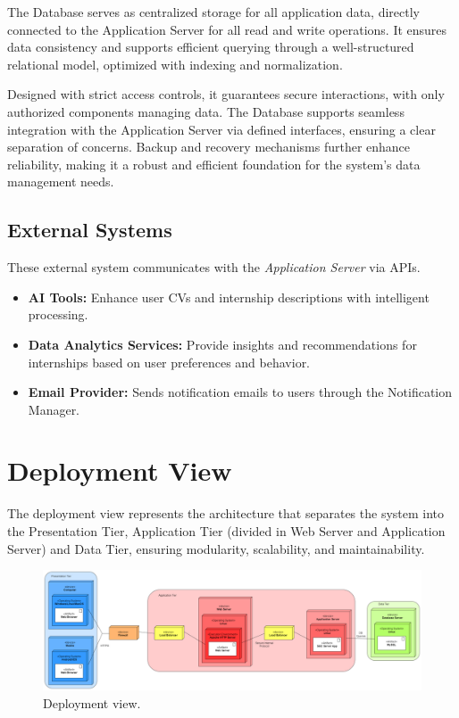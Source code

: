 The Database serves as centralized storage for all application data, directly connected to the Application Server for all read and write operations. It ensures data consistency and supports efficient querying through a well-structured relational model, optimized with indexing and normalization. 

Designed with strict access controls, it guarantees secure interactions, with only authorized components managing data. The Database supports seamless integration with the Application Server via defined interfaces, ensuring a clear separation of concerns. Backup and recovery mechanisms further enhance reliability, making it a robust and efficient foundation for the system's data management needs.

\subsection{External Systems}
\label{subsec:external_systems}%

These external system communicates with the \textit{Application Server} via APIs.

\begin{itemize}
    \item
        \textbf{AI Tools:} Enhance user CVs and internship descriptions with intelligent processing.
    \item
        \textbf{Data Analytics Services:} Provide insights and recommendations for internships based on user preferences and behavior.
        \item 
        \textbf{Email Provider:} Sends notification emails to users through the Notification Manager.
\end{itemize}

\newpage 

\section{Deployment View}
\label{sec:deployment_view}

The deployment view represents the architecture that separates the system into the Presentation Tier, Application Tier (divided in Web Server and Application Server) and Data Tier, ensuring modularity, scalability, and maintainability.

\begin{figure}[H]
    \centering
    \includegraphics[width=\linewidth]{DD/Images/deploymentView.png}
    \caption{Deployment view.}
    \label{fig:deployment_view}
\end{figure}

